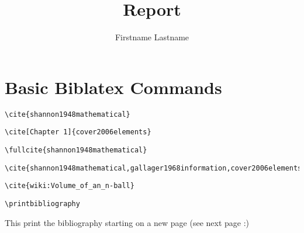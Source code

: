 \documentclass{scrreprt}
\title{Report}
\author{Firstname Lastname}
\begin{document}
\maketitle

\chapter{Basic Biblatex Commands}

\begin{verbatim}
\cite{shannon1948mathematical}
\end{verbatim}
\cite{shannon1948mathematical}
\begin{verbatim}
\cite[Chapter 1]{cover2006elements}
\end{verbatim}
\cite[Chapter 1]{cover2006elements}
\begin{verbatim}
\fullcite{shannon1948mathematical}
\end{verbatim}
\begin{verbatim}
\cite{shannon1948mathematical,gallager1968information,cover2006elements}
\end{verbatim}
\cite{shannon1948mathematical,gallager1968information,cover2006elements}
\begin{verbatim}
\cite{wiki:Volume_of_an_n-ball}
\end{verbatim}
\cite{wiki:Volume_of_an_n-ball}
\begin{verbatim}
\printbibliography
\end{verbatim}
This print the bibliography starting on a new page (see next page :)
\printbibliography
\end{document}
